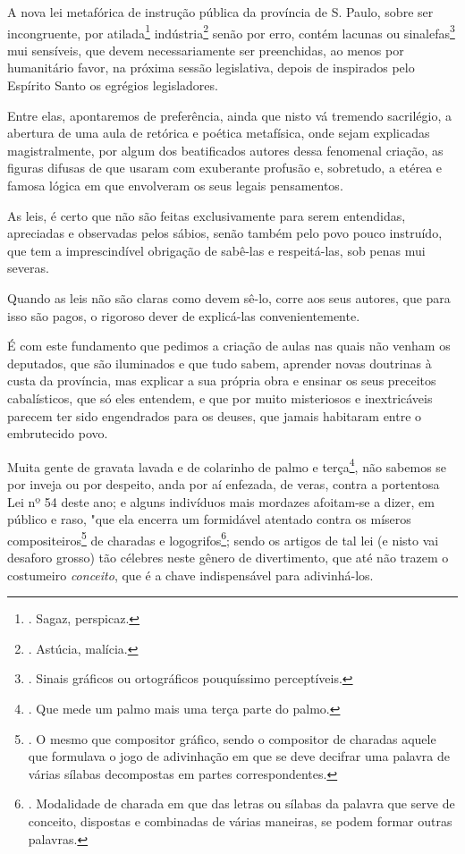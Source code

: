 A nova lei metafórica de instrução pública da província de S. Paulo,
sobre ser incongruente, por atilada\footnote{. Sagaz, perspicaz.}
indústria\footnote{. Astúcia, malícia.} senão por erro, contém lacunas
ou sinalefas\footnote{. Sinais gráficos ou ortográficos pouquíssimo
  perceptíveis.} mui sensíveis, que devem necessariamente ser
preenchidas, ao menos por humanitário favor, na próxima sessão
legislativa, depois de inspirados pelo Espírito Santo os egrégios
legisladores.

Entre elas, apontaremos de preferência, ainda que nisto vá tremendo
sacrilégio, a abertura de uma aula de retórica e poética metafísica,
onde sejam explicadas magistralmente, por algum dos beatificados autores
dessa fenomenal criação, as figuras difusas de que usaram com exuberante
profusão e, sobretudo, a etérea e famosa lógica em que envolveram os
seus legais pensamentos.

As leis, é certo que não são feitas exclusivamente para serem
entendidas, apreciadas e observadas pelos sábios, senão também pelo povo
pouco instruído, que tem a imprescindível obrigação de sabê-las e
respeitá-las, sob penas mui severas.

Quando as leis não são claras como devem sê-lo, corre aos seus autores,
que para isso são pagos, o rigoroso dever de explicá-las
convenientemente.

É com este fundamento que pedimos a criação de aulas nas quais não
venham os deputados, que são iluminados e que tudo sabem, aprender novas
doutrinas à custa da província, mas explicar a sua própria obra e
ensinar os seus preceitos cabalísticos, que só eles entendem, e que por
muito misteriosos e inextricáveis parecem ter sido engendrados para os
deuses, que jamais habitaram entre o embrutecido povo.

Muita gente de gravata lavada e de colarinho de palmo e
terça\footnote{. Que mede um palmo mais uma terça parte do palmo.}, não
sabemos se por inveja ou por despeito, anda por aí enfezada, de veras,
contra a portentosa Lei nº 54 deste ano; e alguns indivíduos mais
mordazes afoitam-se a dizer, em público e raso, "que ela encerra um
formidável atentado contra os míseros compositeiros\footnote{. O mesmo
  que compositor gráfico, sendo o compositor de charadas aquele que
  formulava o jogo de adivinhação em que se deve decifrar uma palavra de
  várias sílabas decompostas em partes correspondentes.} de charadas e
logogrifos\footnote{. Modalidade de charada em que das letras ou sílabas
  da palavra que serve de conceito, dispostas e combinadas de várias
  maneiras, se podem formar outras palavras.}; sendo os artigos de tal
lei (e nisto vai desaforo grosso) tão célebres neste gênero de
divertimento, que até não trazem o costumeiro \emph{conceito}, que é a
chave indispensável para adivinhá-los.

